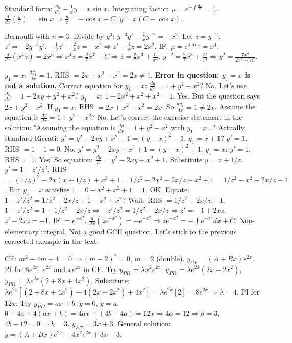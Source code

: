 \documentclass[11pt]{article}
\begin{document}
\begin{corrige}[Exercise 2]
Standard form: $\frac{dy}{dx} - \frac{1}{x}y = x\sin x$.
Integrating factor: $\mu = e^{-\int \frac{dx}{x}} = \frac{1}{x}$.
$\frac{d}{dx}\left(\frac{y}{x}\right) = \sin x \Rightarrow \frac{y}{x} = -\cos x + C$.
$\boxed{y = x(C - \cos x)}$.
\end{corrige}

\begin{corrige}[Exercise 3]
Bernoulli with $n=3$. Divide by $y^3$: $y^{-3}y' - \frac{2}{x}y^{-2} = -x^2$.
Let $z=y^{-2}$, $z' = -2y^{-3}y'$.
$-\frac{1}{2}z' - \frac{2}{x}z = -x^2 \Rightarrow z' + \frac{4}{x}z = 2x^2$.
IF: $\mu = e^{4\ln x} = x^4$.
$\frac{d}{dx}(x^4 z) = 2x^6 \Rightarrow x^4 z = \frac{2}{7}x^7 + C \Rightarrow z = \frac{2}{7}x^3 + \frac{C}{x^4}$.
$y^{-2} = \frac{2}{7}x^3 + \frac{C}{x^4} \Rightarrow \boxed{y^2 = \frac{7x^4}{2x^7 + 7C}}$.
\end{corrige}

\begin{corrige}[Exercise 4]
$y_1=x$: $\frac{dy_1}{dx}=1$. RHS $= 2x + x^2 - x^2 = 2x \neq 1$. \textbf{Error in question: $y_1=x$ is not a solution.}
Correct equation for $y_1=x$: $\frac{dy}{dx} = 1 + y^2 - x^2$? No.
Let's use $\frac{dy}{dx} = 1 - 2xy + y^2 + x^2$? $y_1=x$: $1-2x^2+x^2+x^2=1$. Yes.
But the question says $2x + y^2 - x^2$. If $y_1=x$, RHS $= 2x + x^2 - x^2 = 2x$. So $\frac{dy_1}{dx}=1 \neq 2x$.
Assume the equation is $\frac{dy}{dx} = 1 + y^2 - x^2$? No.
Let's correct the exercise statement in the solution: "Assuming the equation is $\frac{dy}{dx} = 1 + y^2 - x^2$ with $y_1=x$..."
Actually, standard Riccati: $y' = y^2 - 2xy + x^2 - 1 = (y-x)^2 - 1$. $y_1=x+1$? $y'=1$, RHS $=1-1=0$. No.
$y' = y^2 - 2xy + x^2 + 1 = (y-x)^2 + 1$. $y_1=x$: $y'=1$, RHS $=1$. Yes!
So equation: $\frac{dy}{dx} = y^2 - 2xy + x^2 + 1$.
Substitute $y = x + 1/z$. $y' = 1 - z'/z^2$.
RHS $= (1/z)^2 - 2x(x+1/z) + x^2 + 1 = 1/z^2 - 2x^2 - 2x/z + x^2 + 1 = 1/z^2 - x^2 - 2x/z + 1$.
But $y_1=x$ satisfies $1 = 0 - x^2 + x^2 + 1 = 1$. OK.
Equate: $1 - z'/z^2 = 1/z^2 - 2x/z + 1 - x^2 + x^2$? Wait.
RHS $= 1/z^2 - 2x/z + 1$.
$1 - z'/z^2 = 1 + 1/z^2 - 2x/z \Rightarrow -z'/z^2 = 1/z^2 - 2x/z \Rightarrow z' = -1 + 2xz$.
$z' - 2xz = -1$. IF $= e^{-x^2}$.
$\frac{d}{dx}(z e^{-x^2}) = -e^{-x^2} \Rightarrow z e^{-x^2} = -\int e^{-x^2}dx + C$.
Non-elementary integral. Not a good GCE question.
Let's stick to the previous corrected example in the text.
\end{corrige}

\begin{corrige}[Exercise 5]
CF: $m^2-4m+4=0 \Rightarrow (m-2)^2=0$, $m=2$ (double). $y_{CF} = (A+Bx)e^{2x}$.
PI for $8e^{2x}$: $e^{2x}$ and $xe^{2x}$ in CF. Try $y_{PI1} = \lambda x^2 e^{2x}$.
$\dot{y}_{PI1} = \lambda e^{2x}(2x+2x^2)$, $\ddot{y}_{PI1} = \lambda e^{2x}(2+8x+4x^2)$.
Substitute: $\lambda e^{2x}[(2+8x+4x^2) - 4(2x+2x^2) + 4x^2] = \lambda e^{2x}[2] = 8e^{2x} \Rightarrow \lambda=4$.
PI for $12x$: Try $y_{PI2} = ax+b$. $\ddot{y}=0$, $\dot{y}=a$.
$0 - 4a + 4(ax+b) = 4ax + (4b-4a) = 12x \Rightarrow 4a=12 \Rightarrow a=3$, $4b-12=0 \Rightarrow b=3$.
$y_{PI2} = 3x+3$.
General solution: $\boxed{y = (A+Bx)e^{2x} + 4x^2e^{2x} + 3x + 3}$.
\end{corrige}
\end{document}
